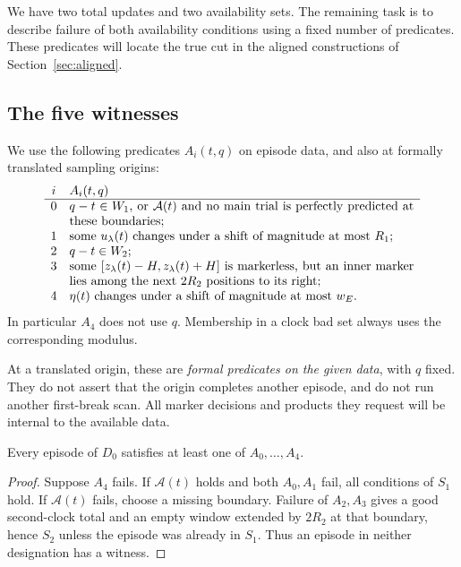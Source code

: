 We have two total updates and two availability sets. The remaining task
is to describe failure of both availability conditions using a fixed
number of predicates. These predicates will locate the true cut in the
aligned constructions of Section~\ref{sec:aligned}.

\subsection{The five witnesses}

We use the following predicates \(A_i(t,q)\) on episode data, and also at
formally translated sampling origins:
\begin{equation}\label{eq:witnesses}
\begin{array}{c@{\quad}p{0.80\linewidth}}
 i & \(A_i(t,q)\)\\ \hline
 0 & \(q-t\in W_1\), or \(\mathcal A(t)\) and no main trial is perfectly
 predicted at these boundaries;\\
 1 & some \(u_\lambda(t)\) changes under a shift of magnitude at most \(R_1\);\\
 2 & \(q-t\in W_2\);\\
 3 & some \([z_\lambda(t)-H,z_\lambda(t)+H]\) is markerless, but an inner
 marker lies among the next \(2R_2\) positions to its right;\\
 4 & \(\eta(t)\) changes under a shift of magnitude at most \(w_E\).
\end{array}
\end{equation}
In particular \(A_4\) does not use \(q\). Membership in a clock bad set always
uses the corresponding modulus.

At a translated origin, these are \emph{formal predicates on the given data},
with \(q\) fixed. They do not assert that the origin completes another episode,
and do not run another first-break scan. All marker decisions and products
they request will be internal to the available data.

\begin{lemma}\label{lem:witness-coverage}
Every episode of \(D_0\) satisfies at least one of \(A_0,\ldots,A_4\).
\end{lemma}

\begin{proof}
Suppose \(A_4\) fails. If \(\mathcal A(t)\) holds and both \(A_0,A_1\) fail,
all conditions of \(S_1\) hold. If \(\mathcal A(t)\) fails, choose a missing
boundary. Failure of \(A_2,A_3\) gives a good second-clock total and an empty
window extended by \(2R_2\) at that boundary, hence \(S_2\) unless the episode
was already in \(S_1\). Thus an episode in neither designation has a witness.
\end{proof}
